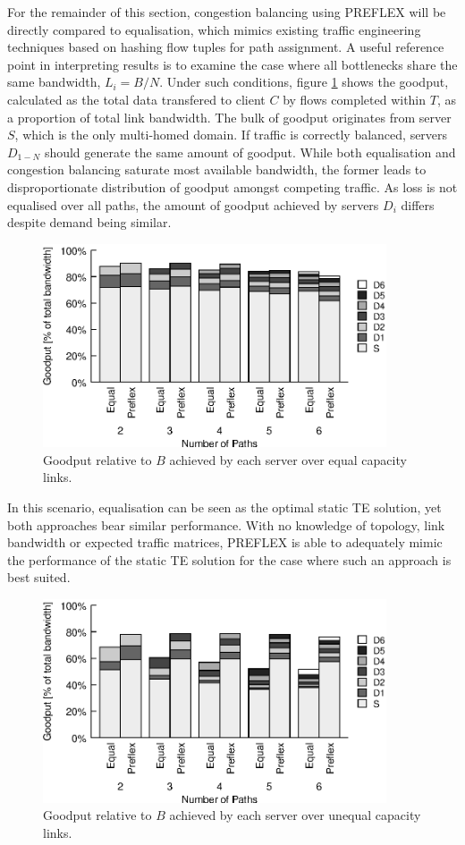 For the remainder of this section, congestion balancing using \ac{PREFLEX} will be directly compared to equalisation, which mimics existing traffic engineering techniques based on hashing flow tuples for path assignment.
A useful reference point in interpreting results is to examine the case where all bottlenecks share the same bandwidth, $L_i=B/N$.
Under such conditions, figure \ref{fig:goodputeq} shows the goodput, calculated as the total data transfered to client $C$ by flows completed within $T$, as a proportion of total link bandwidth.
The bulk of goodput originates from server $S$, which is the only multi-homed domain.
If traffic is correctly balanced, servers $D_{1-N}$ should generate the same amount of goodput.
While both equalisation and congestion balancing saturate most available bandwidth, the former leads to disproportionate distribution of goodput amongst competing traffic. 
As loss is not equalised over all paths, the amount of goodput achieved by servers $D_i$ differs despite demand being similar.
\begin{figure}
    \centering
    \includegraphics[width=4in]{figures/cate/eqbw}
    \caption[Goodput achieved over equal capacity links.]{Goodput relative to $B$ achieved by each server over equal capacity links.}
    \label{fig:goodputeq}
\end{figure}

In this scenario, equalisation can be seen as the optimal static TE solution, yet both approaches bear similar performance. 
With no knowledge of topology, link bandwidth or expected traffic matrices, \ac{PREFLEX} is able to adequately mimic the performance of the static TE solution for the case where such an approach is best suited.

\begin{figure}
    \centering
    \includegraphics[width=4in]{figures/cate/diffbw}
    \caption[Goodput achieved over unequal capacity links.]{Goodput relative to $B$ achieved by each server over unequal capacity links.}
    \label{fig:goodputdiff}
\end{figure}

